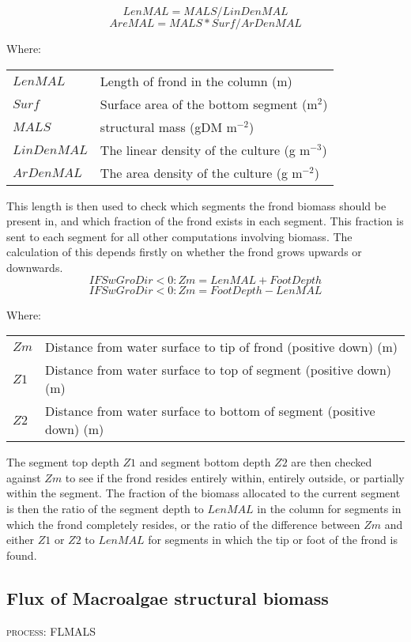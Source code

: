 \documentclass{deltares_manual}
\begin{document}
\[LenMAL = MALS/ LinDenMAL\] 
\[AreMAL = MALS * Surf / ArDenMAL\] 

Where:\\
\begin{tabular}{ll}
$LenMAL$ & Length of frond in the column (m)\\
$Surf$ & Surface area of the bottom segment (m$^{2}$)\\
$MALS$ & structural mass (gDM m$^{-2}$)\\
$LinDenMAL$ & The linear density of the culture (g m$^{-3}$)\\
$ArDenMAL$ & The area density of the culture (g m$^{-2}$)\\
\end{tabular}

This length is then used to check which segments the frond biomass should be present in, and which fraction of the frond exists in each segment. This fraction is sent to each segment for all other computations involving biomass. The calculation of this depends firstly on whether the frond grows upwards or downwards.
\[IF SwGroDir < 0: Zm = LenMAL + FootDepth\]
\[IF SwGroDir < 0: Zm = FootDepth - LenMAL\]

Where:\\
\begin{tabular}{ll}
$Zm$ & Distance from water surface to tip of frond (positive down) (m)\\
$Z1$ & Distance from water surface to top of segment (positive down) (m)\\
$Z2$ & Distance from water surface to bottom of segment (positive down) (m)\\
\end{tabular}

The segment top depth $Z1$ and segment bottom depth $Z2$ are then checked against $Zm$ to see if the frond resides entirely within, entirely outside, or partially within the segment. The fraction of the biomass allocated to the current segment is then the ratio of the segment depth to $LenMAL$ in the column for segments in which the frond completely resides, or the ratio of the difference between $Zm$ and either $Z1$ or $Z2$ to $LenMAL$ for segments in which the tip or foot of the frond is found.

\subsection{Flux of Macroalgae structural biomass}
\begin{flushright}
\textsc{process: FLMALS}
\end{flushright}
\end{document}
